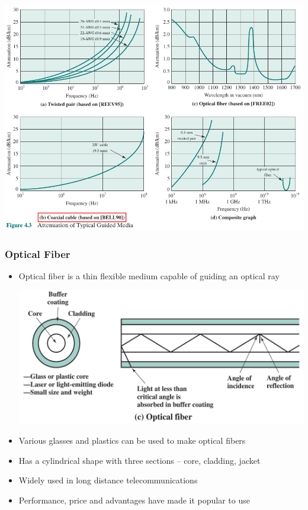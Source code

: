\documentclass[pdflatex,compress]{beamer}
\begin{document}
\begin{frame}
	\begin{center}
		\includegraphics[width=0.8\linewidth]{img/img12}
	\end{center}
\end{frame}

\begin{frame}
	\frametitle{Optical Fiber}
	\begin{itemize}
		\item Optical fiber is a thin flexible medium capable of guiding an optical ray
		\begin{center}
			\includegraphics[width=0.5\linewidth]{img/img05}
		\end{center}
		\item Various glasses and plastics can be used to make optical fibers
		\item Has a cylindrical shape with three sections – core, cladding, jacket
		\item Widely used in long distance telecommunications
		\item Performance, price and advantages have made it popular to use
	\end{itemize}
\end{frame}
\end{document}
